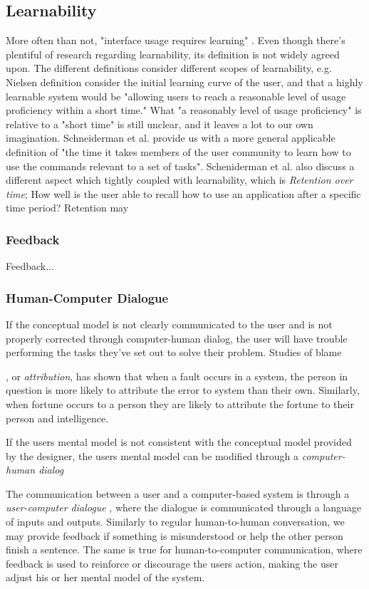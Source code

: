 \begin{enumerate}
\subsection{Learnability}
More often than not, "interface usage requires learning" \cite{Grossman2009}. Even though there’s plentiful of research regarding learnability, its definition is not widely agreed upon. The different definitions consider different scopes of learnability, e.g. Nielsen definition consider the initial learning curve of the user, and that a highly learnable system would be "allowing users to reach a reasonable level of usage proficiency within a short time." What "a reasonably level of usage proficiency" is relative to a "short time" is still unclear, and it leaves a lot to our own imagination. Schneiderman et al. provide us with a more general applicable definition of "the time it takes members of the user community to learn how to use the commands relevant to a set of tasks". Scheniderman et al. also discuss a different aspect which tightly coupled with learnability, which is \textit{Retention over time}; How well is the user able to recall how to use an application after a specific time period? Retention may

\subsubsection{Feedback}
Feedback...

\subsubsection{Human-Computer Dialogue}

If the conceptual model is not clearly communicated to the user and is not properly corrected through computer-human dialog, the user will have trouble performing the tasks they've set out to solve their problem. Studies of blame , or \textit{attribution}, has shown that when a fault occurs in a system, the person in question is more likely to attribute the error to system than their own. Similarly, when fortune occurs to a person they are likely to attribute the fortune to their person and intelligence.

If the users mental model is not consistent with the conceptual model provided by the designer, the users mental model can be modified through a \textit{computer-human dialog}

The communication between a user and a computer-based system is through a \textit{user-computer dialogue} \cite{Foley1996}, where the dialogue is communicated through a language of inputs and outputs. Similarly to regular human-to-human conversation, we may provide feedback if something is misunderstood or help the other person finish a sentence. The same is true for human-to-computer communication, where feedback is used to reinforce or discourage the users action, making the user adjust his or her mental model of the system.


\end{enumerate}
